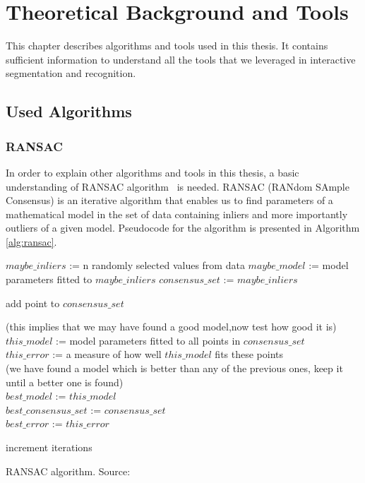 \chapter{Theoretical Background and Tools}
\label{chapter:Background}
This chapter describes algorithms and tools used in this thesis. It contains sufficient information to understand all the tools that we leveraged in interactive segmentation and recognition.
\section{Used Algorithms}
\subsection{RANSAC}
In order to explain other algorithms and tools in this thesis, a basic understanding of RANSAC algorithm~\cite{ransac} is needed. RANSAC (RANdom SAmple Consensus) is an iterative algorithm that enables us to find parameters of a mathematical model in the set of data containing inliers and more importantly outliers of a given model. Pseudocode for the algorithm is presented in Algorithm \ref{alg:ransac}. 

\begin{algorithm}[htb!]
{
$maybe\_inliers$ := n randomly selected values from data
$maybe\_model$ := model parameters fitted to $maybe\_inliers$
$consensus\_set$ := $maybe\_inliers$

{

{
add point to $consensus\_set$
}

}

{
(this implies that we may have found a good model,now test how good it is)\\
$this\_model$ := model parameters fitted to all points in $consensus\_set$\\
$this\_error$ := a measure of how well $this\_model$ fits these points\\



{            (we have found a model which is better than any of the previous ones,
            keep it until a better one is found)\\
            $best\_model$ := $this\_model$\\
            $best\_consensus\_set$ := $consensus\_set$\\
            $best\_error$ := $this\_error$\\
}


}
    increment iterations

}


\caption{RANSAC algorithm. Source:~\cite{ransac}}
  \label{alg:ransac}
\end{algorithm}

